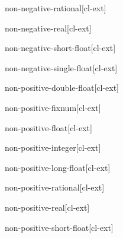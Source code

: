 \documentclass[10pt,english]{book}
\begin{document}
\begin{type}{non-negative-rational}{}[cl-ext]
  
\end{type}

\begin{type}{non-negative-real}{}[cl-ext]
  
\end{type}

\begin{type}{non-negative-short-float}{}[cl-ext]
  
\end{type}

\begin{type}{non-negative-single-float}{}[cl-ext]
  
\end{type}

\begin{type}{non-positive-double-float}{}[cl-ext]
  
\end{type}

\begin{type}{non-positive-fixnum}{}[cl-ext]
  
\end{type}

\begin{type}{non-positive-float}{}[cl-ext]
  
\end{type}

\begin{type}{non-positive-integer}{}[cl-ext]
  
\end{type}

\begin{type}{non-positive-long-float}{}[cl-ext]
  
\end{type}

\begin{type}{non-positive-rational}{}[cl-ext]
  
\end{type}

\begin{type}{non-positive-real}{}[cl-ext]
  
\end{type}

\begin{type}{non-positive-short-float}{}[cl-ext]
  
\end{type}
\end{document}
